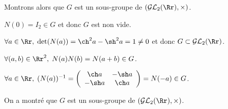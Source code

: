 {{Montrons alors que $G$ est un sous-groupe de $(\mathcal{GL}_2(\Rr),\times)$.

$N(0)=I_2\in G$ et donc $G$ est non vide.

$\forall a\in\Rr,\;\mbox{det}(N(a))=\ch^2a-\sh^2a=1\neq0$ et donc $G\subset\mathcal{GL}_2(\Rr)$.

$\forall(a,b)\in\Rr^2,\;N(a)N(b)=N(a+b)\in G$.

$\forall a\in\Rr,\;(N(a))^{-1}=\left(
\begin{array}{cc}
\ch a&-\sh a\\
-\sh a&\ch a
\end{array}
\right)=N(-a)\in G$.

On a montré que $G$ est un sous-groupe de $(\mathcal{GL}_2(\Rr),\times)$.}
}